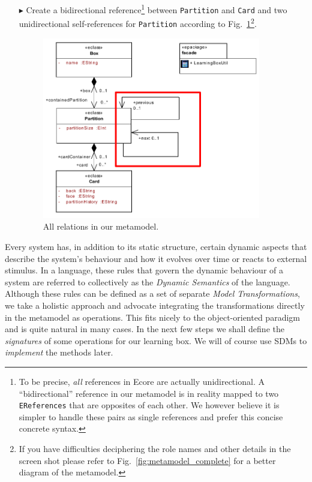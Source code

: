 \begin{enumerate}
\item[$\blacktriangleright$] Create a bidirectional reference\footnote{To be precise, \emph{all} references in Ecore are actually unidirectional.  
A ``bidirectional'' reference in our metamodel is in reality mapped to two \texttt{EReferences} that are opposites of each other.  
We however believe it is simpler to handle these pairs as single references and prefer this concise concrete syntax.} between \texttt{Partition} and \texttt{Card} and two unidirectional self-references for \texttt{Partition} according to Fig.~\ref{fig:ereferences_all}\footnote{If you have difficulties deciphering the role names and other details in the screen shot please refer to Fig.~\ref{fig:metamodel_complete} for a better diagram of the metamodel.}.
 
\begin{figure}[htbp]
	\centering
  \includegraphics[width=0.9\textwidth]{pics/memBoxBilder/memBox34.pdf}
	\caption{All relations in our metamodel.}
	\label{fig:ereferences_all}  
\end{figure}
\end{enumerate}

Every system has, in addition to its static structure, certain dynamic aspects that describe the system's behaviour and how it evolves over time or reacts to external stimulus.
In a language, these rules that govern the dynamic behaviour of a system are referred to collectively as the \emph{Dynamic Semantics} of the language.  
Although these rules can be defined as a set of separate \emph{Model Transformations}, we take a holistic approach and advocate integrating the transformations directly in the metamodel as operations.
This fits nicely to the object-oriented paradigm and is quite natural in many cases.  
In the next few steps we shall define the \emph{signatures} of some operations for our learning box.  
We will of course use SDMs to \emph{implement} the methods later.

